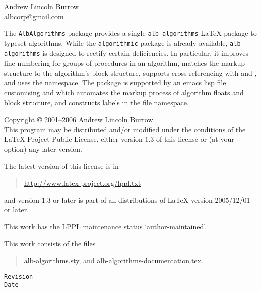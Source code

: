 \documentclass[11pt,a4paper,oneside,titlepage]{alb-corp}
\begin{document}


\begin{albTitlePage}


  Andrew Lincoln Burrow\\
  \url{albcorp@gmail.com}



  The \texttt{AlbAlgorithms} package provides a single
  \texttt{alb-algorithms} \LaTeX{} package to typeset algorithms.  While
  the \texttt{algorithmic} package is already available,
  \texttt{alb-algorithms} is designed to rectify certain deficiencies.
  In particular, it improves line numbering for groups of procedures in
  an algorithm, matches the markup structure to the algorithm's block
  structure, supports cross-referencing with \AUCTeX{} and \RefTeX{},
  and uses the \albLogo{} namespace.  The package is supported by an
  emacs lisp file customising \AUCTeX{} and \RefTeX{} which automates
  the markup process of algorithm floats and block structure, and
  constructs labels in the file namespace.



  Copyright \copyright{} 2001--2006 Andrew Lincoln Burrow.\\
  This program may be distributed and/or modified under the conditions
  of the \LaTeX{} Project Public License, either version 1.3 of this
  license or (at your option) any later version.

  \medskip{}

  The latest version of this license is in
  \begin{quote}
    \url{http://www.latex-project.org/lppl.txt}
  \end{quote}
  and version 1.3 or later is part of all distributions of LaTeX version
  2005/12/01 or later.

  \medskip{}

  This work has the LPPL maintenance status `author-maintained'.

  \medskip{}

  This work consists of the files
  \begin{quote}
    \begin{flushleft}
      \url{alb-algorithms.sty}, and
      \url{alb-algorithms-documentation.tex}.
    \end{flushleft}
  \end{quote}



  \verb$Revision$\\
  \verb$Date$

\end{albTitlePage}
\end{document}
